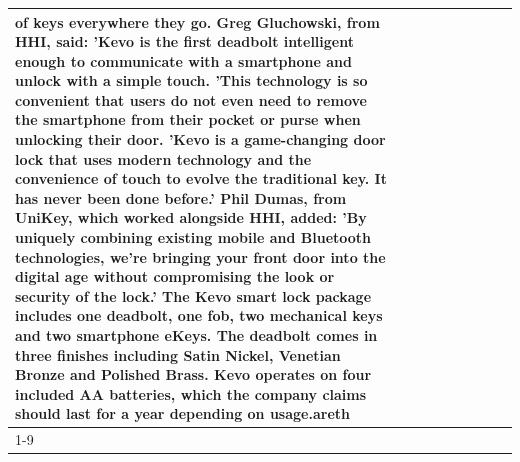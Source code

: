 \begin{table}[H]
\begin{tabular}{lllrlllll}
of keys everywhere they go. Greg Gluchowski, from HHI, said: 'Kevo is the first deadbolt intelligent enough to communicate with a smartphone and unlock with a simple touch. 'This technology is so convenient that users do not even need to remove the smartphone from their pocket or purse when unlocking their door. 'Kevo is a game-changing door lock that uses modern technology and the convenience of touch to evolve the traditional key. It has never been done before.' Phil Dumas, from UniKey, which worked alongside HHI, added: 'By uniquely combining existing mobile and Bluetooth technologies, we’re bringing your front door into the digital age without compromising the look or security of the lock.' The Kevo smart lock package includes one deadbolt, one fob, two mechanical keys and two smartphone eKeys. The deadbolt comes in three finishes including Satin Nickel, Venetian Bronze and Polished Brass. Kevo operates on four included AA batteries, which the company claims should last for a year depending on usage.areth \\
\cline{1-9}

\end{tabular}
\end{table}
